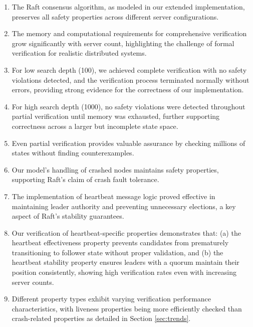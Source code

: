 \begin{enumerate}
    \item The Raft consensus algorithm, as modeled in our extended implementation, preserves all safety properties across different server configurations.
    
    \item The memory and computational requirements for comprehensive verification grow significantly with server count, highlighting the challenge of formal verification for realistic distributed systems.
    
    \item For low search depth (100), we achieved complete verification with no safety violations detected, and the verification process terminated normally without errors, providing strong evidence for the correctness of our implementation.
    
    \item For high search depth (1000), no safety violations were detected throughout partial verification until memory was exhausted, further supporting correctness across a larger but incomplete state space.
    
    \item Even partial verification provides valuable assurance by checking millions of states without finding counterexamples.
    
    \item Our model's handling of crashed nodes maintains safety properties, supporting Raft's claim of crash fault tolerance.
    
    \item The implementation of heartbeat message logic proved effective in maintaining leader authority and preventing unnecessary elections, a key aspect of Raft's stability guarantees.
    
    \item Our verification of heartbeat-specific properties demonstrates that: (a) the heartbeat effectiveness property prevents candidates from prematurely transitioning to follower state without proper validation, and (b) the heartbeat stability property ensures leaders with a quorum maintain their position consistently, showing high verification rates even with increasing server counts.

    \item Different property types exhibit varying verification performance characteristics, with liveness properties being more efficiently checked than crash-related properties as detailed in Section \ref{sec:trends}.
\end{enumerate}

